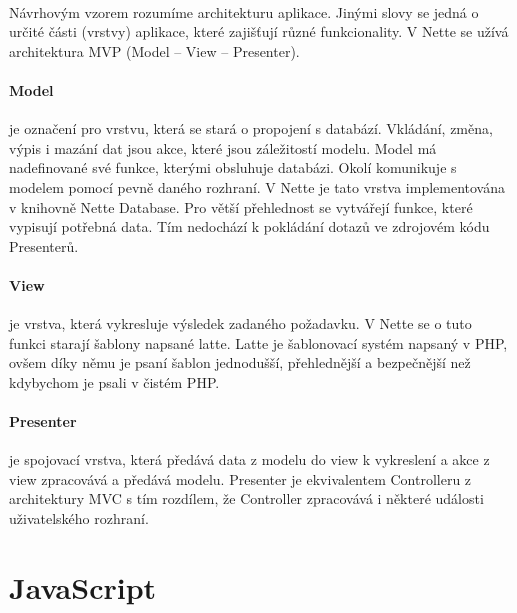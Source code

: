 \documentclass[11pt,a4paper,titlepage,oneside]{book}
\begin{document}
				\paragraph{} Návrhovým vzorem rozumíme architekturu aplikace. Jinými slovy se jedná o určité části (vrstvy) aplikace, které zajišťují různé funkcionality. V Nette se užívá architektura MVP (Model -- View -- Presenter).


				\paragraph{Model} je označení pro vrstvu, která se stará o propojení s databází. Vkládání, změna, výpis i mazání dat jsou akce, které jsou záležitostí modelu. Model má nadefinované své funkce, kterými obsluhuje databázi. Okolí komunikuje s modelem pomocí pevně daného rozhraní. V Nette je tato vrstva implementována v knihovně Nette Database. Pro větší přehlednost se vytvářejí funkce, které vypisují potřebná data. Tím nedochází k pokládání dotazů ve zdrojovém kódu Presenterů.



				\paragraph{View} je vrstva, která vykresluje výsledek zadaného požadavku. V Nette se o tuto funkci starají šablony napsané latte. Latte je šablonovací systém napsaný v PHP, ovšem díky němu je psaní šablon jednodušší, přehlednější a bezpečnější než kdybychom je psali v čistém PHP.
				\paragraph{Presenter} je spojovací vrstva, která předává data z modelu do view k vykreslení a akce z view zpracovává a předává modelu. Presenter je ekvivalentem Controlleru z architektury MVC s tím rozdílem, že Controller zpracovává i některé události uživatelského rozhraní.

	\section{JavaScript} %
\end{document}
